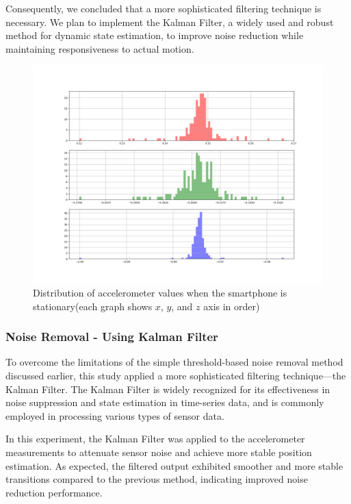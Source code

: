\documentclass{article}
\begin{document}
    Consequently, we concluded that a more sophisticated filtering technique is necessary.
    We plan to implement the Kalman Filter, a widely used and robust method for dynamic
    state estimation, to improve noise reduction while maintaining
    responsiveness to actual motion.

    \FloatBarrier
    \begin{figure}[ht]
        \centering
        \includegraphics[width=\textwidth]{2_1_7_1.png}
        \caption{Distribution of accelerometer values when the smartphone is
        stationary(each graph shows $x$, $y$, and $z$ axis in order)}
        \label{fig:accel_histogram}
    \end{figure}

    \FloatBarrier
    \subsubsection{Noise Removal - Using Kalman Filter}
    To overcome the limitations of the simple threshold-based noise removal method
    discussed earlier, this study applied a more sophisticated filtering
    technique—the Kalman Filter. The Kalman Filter is widely recognized for its effectiveness
    in noise suppression and state estimation in time-series data, and is
    commonly employed in processing various types of sensor data.

    In this experiment, the Kalman Filter was applied to the accelerometer measurements
    to attenuate sensor noise and achieve more stable position estimation. As
    expected, the filtered output exhibited smoother and more stable transitions
    compared to the previous method, indicating improved noise reduction
    performance.
\end{document}
